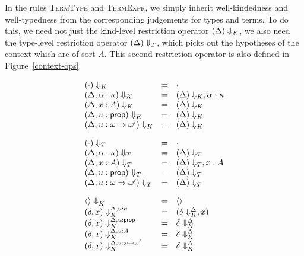 In the rules \textsc{TermType} and \textsc{TermExpr}, we simply
inherit well-kindedness and well-typedness from the corresponding
judgements for types and terms. To do this, we need not just the
kind-level restriction operator $\restrictkind{\Delta}$, we also need
the type-level restriction operator $\restricttype{\Delta}$, which
picks out the hypotheses of the context which are of sort $A$. This
second restriction operator is also defined in
Figure~\ref{context-ops}.

\begin{figure}
\begin{displaymath}
\begin{array}{lcl}
\restrictkind{\cdot}                 & = & \cdot \\
\restrictkind{\Delta, \alpha:\kappa} & = & \restrictkind{\Delta}, \alpha:\kappa \\
\restrictkind{\Delta, x:A}           & = & \restrictkind{\Delta} \\
\restrictkind{\Delta, u:\assert}     & = & \restrictkind{\Delta} \\
\restrictkind{\Delta, u:\omega \To \omega'} & = & \restrictkind{\Delta} \\[1em]

\restricttype{\cdot}                 & = & \cdot \\
\restricttype{\Delta, \alpha:\kappa} & = & \restricttype{\Delta} \\
\restricttype{\Delta, x:A}           & = & \restricttype{\Delta}, x:A \\
\restricttype{\Delta, u:\assert}     & = & \restricttype{\Delta} \\
\restricttype{\Delta, u:\omega \To \omega'} & = & \restricttype{\Delta} \\[1em]

\restricttyenv{\cdot}{\unit}                     & = & \unit \\ 
\restricttyenv{\Delta, u:\kappa}{(\delta, x)}    & = & (\restricttyenv{\Delta}{\delta}, x) \\
\restricttyenv{\Delta, u:\assert}{(\delta, x)}   & = & \restricttyenv{\Delta}{\delta} \\
\restricttyenv{\Delta, u:A}{(\delta, x)}         & = & \restricttyenv{\Delta}{\delta} \\
\restricttyenv{\Delta,u:\omega \To \omega'}{(\delta, x)} &=& \restricttyenv{\Delta}{\delta} \\[1em]


\end{array}
\end{displaymath}
\end{figure}
